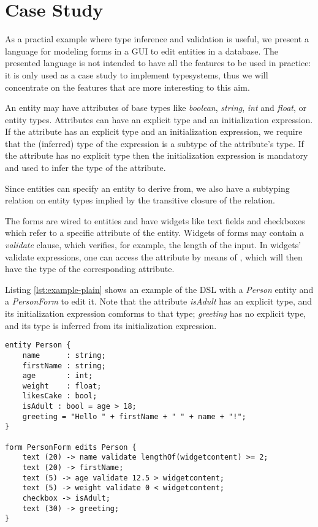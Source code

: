 \section{Case Study}
\label{sec:casestudy}

As a practial example where type inference and validation is useful, we present
a language for modeling forms in a GUI to edit entities in a database.  The
presented language is not intended to have all the features to be used in
practice: it is only used as a case study to implement typesystems, thus we
will concentrate on the features that are more interesting to this aim.

An entity
may have attributes of base types like \emph{boolean}, \emph{string}, \emph{int} and \emph{float}, or entity types.
Attributes can have an explicit type and an initialization expression.
If the attribute has an explicit type and an initialization expression, we
require that the (inferred) type of the expression is a subtype of the
attribute's type. If the attribute has no explicit type then the 
initialization expression is mandatory and used to infer the type of the attribute.

Since entities can specify an entity to derive from, we also have a subtyping
relation on entity types implied by the transitive closure of the 
relation.

The forms are wired to entities and have widgets like text fields and
checkboxes which refer to a specific attribute of the entity.
Widgets of forms may contain a \emph{validate} clause, which verifies, for
example, the length of the input.
In widgets' validate expressions, one can access the attribute by means of
, which will then have the type of the corresponding
attribute.

Listing \ref{lst:example-plain} shows an example of the DSL with a \emph{Person}
entity and a \emph{PersonForm} to edit it. Note that the attribute
\emph{isAdult} has an explicit type, and its initialization expression
comforms to that type; \emph{greeting} has no explicit type, and its type is
inferred from its initialization expression.

%

\begin{lstlisting}[language=guidsl,float,label=lst:example-plain,caption=Forms
and Entities DSL.] 
entity Person {
	name      : string;
	firstName : string;
	age       : int; 
	weight    : float;
	likesCake : bool; 
	isAdult : bool = age > 18;
	greeting = "Hello " + firstName + " " + name + "!";
}

form PersonForm edits Person {
	text (20) -> name validate lengthOf(widgetcontent) >= 2;
	text (20) -> firstName;
	text (5) -> age validate 12.5 > widgetcontent;
	text (5) -> weight validate 0 < widgetcontent;
	checkbox -> isAdult;
	text (30) -> greeting;
}
\end{lstlisting}


